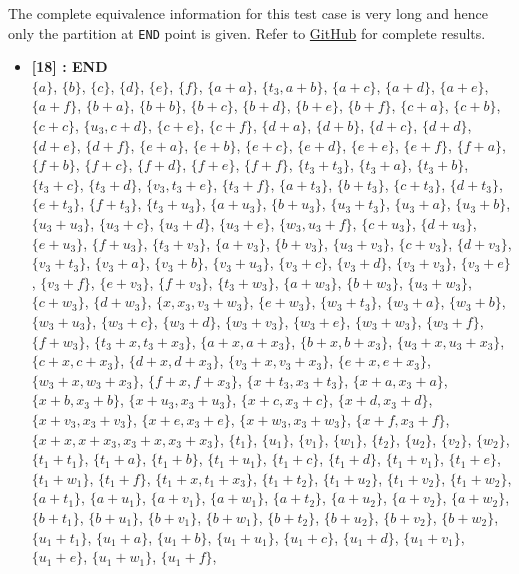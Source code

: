 The complete equivalence information for this test case is very long and hence only the partition at \texttt{END} point is given. Refer to \href{https://github.com/himanshu520/HerbrandEquivalence/blob/master/ToyLanguage/testcases/outputs/tc14}{GitHub} for complete results.
\begin{itemize}

    \item \textbf{[18] : END}\\
        $\{a\}$, $\{b\}$, $\{c\}$, $\{d\}$, $\{e\}$, $\{f\}$, $\{a + a\}$, $\{t_3, a + b\}$, $\{a + c\}$, $\{a + d\}$, $\{a + e\}$, $\{a + f\}$, $\{b + a\}$, $\{b + b\}$, $\{b + c\}$, $\{b + d\}$, $\{b + e\}$, $\{b + f\}$, $\{c + a\}$, $\{c + b\}$, $\{c + c\}$, $\{u_3, c + d\}$, $\{c + e\}$, $\{c + f\}$, $\{d + a\}$, $\{d + b\}$, $\{d + c\}$, $\{d + d\}$, $\{d + e\}$, $\{d + f\}$, $\{e + a\}$, $\{e + b\}$, $\{e + c\}$, $\{e + d\}$, $\{e + e\}$, $\{e + f\}$, $\{f + a\}$, $\{f + b\}$, $\{f + c\}$, $\{f + d\}$, $\{f + e\}$, $\{f + f\}$, $\{t_3 + t_3\}$, $\{t_3 + a\}$, $\{t_3 + b\}$, $\{t_3 + c\}$, $\{t_3 + d\}$, $\{v_3, t_3 + e\}$, $\{t_3 + f\}$, $\{a + t_3\}$, $\{b + t_3\}$, $\{c + t_3\}$, $\{d + t_3\}$, $\{e + t_3\}$, $\{f + t_3\}$, $\{t_3 + u_3\}$, $\{a + u_3\}$, $\{b + u_3\}$, $\{u_3 + t_3\}$, $\{u_3 + a\}$, $\{u_3 + b\}$, $\{u_3 + u_3\}$, $\{u_3 + c\}$, $\{u_3 + d\}$, $\{u_3 + e\}$, $\{w_3, u_3 + f\}$, $\{c + u_3\}$, $\{d + u_3\}$, $\{e + u_3\}$, $\{f + u_3\}$, $\{t_3 + v_3\}$, $\{a + v_3\}$, $\{b + v_3\}$, $\{u_3 + v_3\}$, $\{c + v_3\}$, $\{d + v_3\}$, $\{v_3 + t_3\}$, $\{v_3 + a\}$, $\{v_3 + b\}$, $\{v_3 + u_3\}$, $\{v_3 + c\}$, $\{v_3 + d\}$, $\{v_3 + v_3\}$, $\{v_3 + e\}$, $\{v_3 + f\}$, $\{e + v_3\}$, $\{f + v_3\}$, $\{t_3 + w_3\}$, $\{a + w_3\}$, $\{b + w_3\}$, $\{u_3 + w_3\}$, $\{c + w_3\}$, $\{d + w_3\}$, $\{x, x_3, v_3 + w_3\}$, $\{e + w_3\}$, $\{w_3 + t_3\}$, $\{w_3 + a\}$, $\{w_3 + b\}$, $\{w_3 + u_3\}$, $\{w_3 + c\}$, $\{w_3 + d\}$, $\{w_3 + v_3\}$, $\{w_3 + e\}$, $\{w_3 + w_3\}$, $\{w_3 + f\}$, $\{f + w_3\}$, $\{t_3 + x, t_3 + x_3\}$, $\{a + x, a + x_3\}$, $\{b + x, b + x_3\}$, $\{u_3 + x, u_3 + x_3\}$, $\{c + x, c + x_3\}$, $\{d + x, d + x_3\}$, $\{v_3 + x, v_3 + x_3\}$, $\{e + x, e + x_3\}$, $\{w_3 + x, w_3 + x_3\}$, $\{f + x, f + x_3\}$, $\{x + t_3, x_3 + t_3\}$, $\{x + a, x_3 + a\}$, $\{x + b, x_3 + b\}$, $\{x + u_3, x_3 + u_3\}$, $\{x + c, x_3 + c\}$, $\{x + d, x_3 + d\}$, $\{x + v_3, x_3 + v_3\}$, $\{x + e, x_3 + e\}$, $\{x + w_3, x_3 + w_3\}$, $\{x + f, x_3 + f\}$, $\{x + x, x + x_3, x_3 + x, x_3 + x_3\}$, $\{t_1\}$, $\{u_1\}$, $\{v_1\}$, $\{w_1\}$, $\{t_2\}$, $\{u_2\}$, $\{v_2\}$, $\{w_2\}$, $\{t_1 + t_1\}$, $\{t_1 + a\}$, $\{t_1 + b\}$, $\{t_1 + u_1\}$, $\{t_1 + c\}$, $\{t_1 + d\}$, $\{t_1 + v_1\}$, $\{t_1 + e\}$, $\{t_1 + w_1\}$, $\{t_1 + f\}$, $\{t_1 + x, t_1 + x_3\}$, $\{t_1 + t_2\}$, $\{t_1 + u_2\}$, $\{t_1 + v_2\}$, $\{t_1 + w_2\}$, $\{a + t_1\}$, $\{a + u_1\}$, $\{a + v_1\}$, $\{a + w_1\}$, $\{a + t_2\}$, $\{a + u_2\}$, $\{a + v_2\}$, $\{a + w_2\}$, $\{b + t_1\}$, $\{b + u_1\}$, $\{b + v_1\}$, $\{b + w_1\}$, $\{b + t_2\}$, $\{b + u_2\}$, $\{b + v_2\}$, $\{b + w_2\}$, $\{u_1 + t_1\}$, $\{u_1 + a\}$, $\{u_1 + b\}$, $\{u_1 + u_1\}$, $\{u_1 + c\}$, $\{u_1 + d\}$, $\{u_1 + v_1\}$, $\{u_1 + e\}$, $\{u_1 + w_1\}$, $\{u_1 + f\}$, 
\end{itemize}
